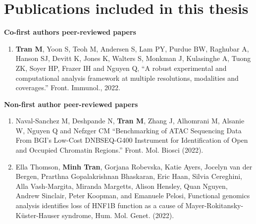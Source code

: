 


\section*{Publications included in this thesis}

\begin{instructional}
    \textbf{Co-first authors peer-reviewed papers}
	
	\begin{enumerate}
    \item \cite{tran2022robust} \textbf{Tran M}, Yoon S, Teoh M, Andersen S, Lam PY, Purdue BW, Raghubar A, Hanson SJ, Devitt K, Jones K, Walters S, Monkman J, Kulasinghe A, Tuong ZK, Soyer HP, Frazer IH and Nguyen Q, ``A robust experimental and computational analysis framework at multiple resolutions, modalities and coverages.'' Front. Immunol., 2022.

    \end{enumerate}
    
    \textbf{Non-first author peer-reviewed papers}
    \begin{enumerate}
        \item \cite{naval2022benchmarking} Naval-Sanchez M, Deshpande N, \textbf{Tran M}, Zhang J, Alhomrani M, Alsanie W, Nguyen Q and Nefzger CM ``Benchmarking of ATAC Sequencing Data From BGI’s Low-Cost DNBSEQ-G400 Instrument for Identification of Open and Occupied Chromatin Regions.'' Front. Mol. Biosci (2022).

        \item Ella Thomson, \textbf{Minh Tran}, Gorjana Robevska, Katie Ayers, Jocelyn van der Bergen, Prarthna Gopalakrishnan Bhaskaran, Eric Haan, Silvia Cereghini, Alla Vash-Margita, Miranda Margetts, Alison Hensley, Quan Nguyen, Andrew Sinclair, Peter Koopman, and Emanuele Pelosi, Functional genomics analysis identifies loss of HNF1B function as a cause of Mayer-Rokitansky-Küster-Hauser syndrome, Hum. Mol. Genet. (2022).
    \end{enumerate}
	
\end{instructional}

